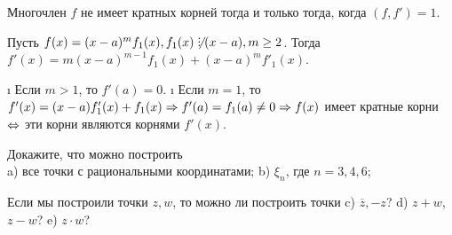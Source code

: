 \begin{problem}[37 (9.2)]
Многочлен $f$ не имеет кратных корней тогда и только тогда, когда $(f,f')=1$.
\end{problem}

\begin{solution}
Пусть \(f(x) = (x-a)^mf_1(x), f_1(x) \not\Divby (x-a), m \ge 2\). Тогда \(f'(x)=m(x-a)^{m-1}f_1(x)+(x-a)^mf'_1(x)\).

\begin{itemize}
\tightlist
\i
  Если \(m>1\), то \(f'(a) = 0\).
\i
  Если \(m=1\), то \(f'(x)=(x-a)f'_1(x)+f_1(x) \Rightarrow f'(a)=f_1(a) \ne 0 \Rightarrow f(x)\) имеет кратные корни \(\Leftrightarrow\) эти корни являются корнями \(f'(x)\).
\end{itemize}

\end{solution}

\begin{problem}[38(9.6)]
Докажите, что можно построить\\ 
a) все точки с рациональными координатами;
b) $\xi_n$, где $n=3,4,6$;

Если мы построили точки $z,w$, то можно ли построить точки 
c) $\overline{z},-z$? 
d) $z+w$, $z-w$?
e) $z\cdot w$?
\end{problem}


